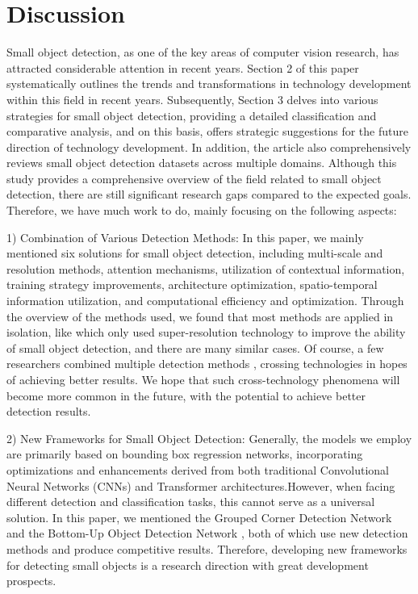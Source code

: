 \documentclass[journal]{IEEEtran}
\begin{document}
\section{Discussion}
\label{section4}
Small object detection, as one of the key areas of computer vision research, has attracted considerable attention in recent years. Section 2 of this paper systematically outlines the trends and transformations in technology development within this field in recent years. Subsequently, Section 3 delves into various strategies for small object detection, providing a detailed classification and comparative analysis, and on this basis, offers strategic suggestions for the future direction of technology development. In addition, the article also comprehensively reviews small object detection datasets across multiple domains. Although this study provides a comprehensive overview of the field related to small object detection, there are still significant research gaps compared to the expected goals. Therefore, we have much work to do, mainly focusing on the following aspects:

  1) Combination of Various Detection Methods: In this paper, we mainly mentioned six solutions for small object detection, including multi-scale and resolution methods, attention mechanisms, utilization of contextual information, training strategy improvements, architecture optimization, spatio-temporal information utilization, and computational efficiency and optimization. Through the overview of the methods used, we found that most methods are applied in isolation, like \cite{xiaolin2022small} which only used super-resolution technology to improve the ability of small object detection, and there are many similar cases. Of course, a few researchers combined multiple detection methods \cite{zeng2022small} , crossing technologies in hopes of achieving better results. We hope that such cross-technology phenomena will become more common in the future, with the potential to achieve better detection results.

  2) New Frameworks for Small Object Detection: Generally, the models we employ are primarily based on bounding box regression networks, incorporating optimizations and enhancements derived from both traditional Convolutional Neural Networks (CNNs) and Transformer architectures.However, when facing different detection and classification tasks, this cannot serve as a universal solution. In this paper, we mentioned the Grouped Corner Detection Network \cite{law2018cornernet}  and the Bottom-Up Object Detection Network \cite{zhou2019bottom}, both of which use new detection methods and produce competitive results. Therefore, developing new frameworks for detecting small objects is a research direction with great development prospects.
\end{document}
